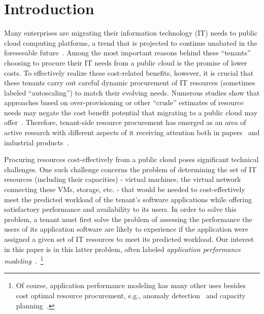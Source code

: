 \section{Introduction}
\vspace{10pt}



Many enterprises are migrating their information technology (IT) needs to public cloud computing platforms, a trend that is projected to continue unabated in the foreseeable future~\cite{forbes}. Among the most important reasons behind these ``tenants'' choosing to procure their IT needs from a public cloud is the promise of lower costs. To effectively realize these cost-related benefits, however, it is crucial that these tenants carry out careful dynamic procurement of IT resources (sometimes labeled ``autoscaling'') to match their evolving needs. Numerous studies show that approaches based on over-provisioning or other ``crude'' estimates of resource needs may negate the cost benefit potential that migrating to a public cloud may offer~\cite{takmig,Li2011,Teregowda10a,Teregowda10b}. Therefore, tenant-side resource procurement has emerged as an area of active research with different aspects of it receiving attention both in  papers~\cite{WuBPKM13,Zafer2012OBS,MenacheSJ14,Zhang15,Farley:2012:MYM:2391229.2391249,DBLP:conf/hotcloud/LeeK11} and industrial products~\cite{cloudphysics,clusterk}. 

Procuring resources cost-effectively from a public cloud %
poses significant technical challenges. One such challenge concerns the problem of determining the set of IT resources (including their capacities) - virtual machines, the virtual network connecting these VMs, storage, etc. - that would be needed to cost-effectively meet the predicted workload of the tenant's software applications while offering satisfactory performance and availability to its users. In order to solve this problem, a tenant must first solve the problem of assessing the performance the users of its application software are likely to experience if the application were assigned a given set of IT resources to meet its predicted workload. Our interest in this paper is in this latter problem, often labeled {\it application performance modeling}~\cite{DBLP:journals/internet/Menasce04,sigmetrics05,Stewart07,SchroederWH06,MiCCS10,ZhangCL14,DBLP:journals/debu/HerodotouB13,DBLP:conf/cmg/MenasceB12}.~\footnote{Of course, application performance modeling has many other uses besides cost optimal resource procurement, e.g., anomaly detection~\cite{Kelly:2005:DPA:1251522.1251530,Cohen:2004:CID:1251254.1251270} and capacity planning~\cite{DBLP:conf/cmg/MenasceN09}.} 

